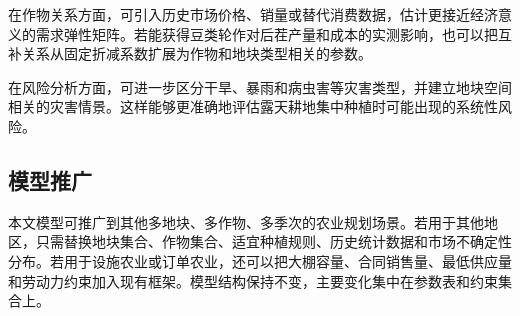 在作物关系方面，可引入历史市场价格、销量或替代消费数据，估计更接近经济意义的需求弹性矩阵。若能获得豆类轮作对后茬产量和成本的实测影响，也可以把互补关系从固定折减系数扩展为作物和地块类型相关的参数。

在风险分析方面，可进一步区分干旱、暴雨和病虫害等灾害类型，并建立地块空间相关的灾害情景。这样能够更准确地评估露天耕地集中种植时可能出现的系统性风险。

\subsection{模型推广}

本文模型可推广到其他多地块、多作物、多季次的农业规划场景。若用于其他地区，只需替换地块集合、作物集合、适宜种植规则、历史统计数据和市场不确定性分布。若用于设施农业或订单农业，还可以把大棚容量、合同销售量、最低供应量和劳动力约束加入现有框架。模型结构保持不变，主要变化集中在参数表和约束集合上。
